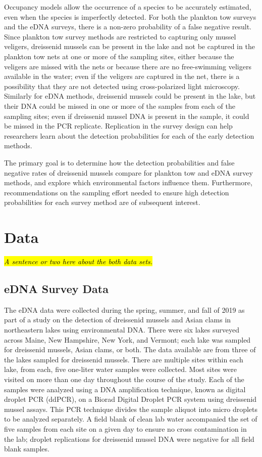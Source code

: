 \documentclass[12pt]{article}\usepackage[]{graphicx}\usepackage[]{color}
\begin{document}
Occupancy models allow the occurrence of a species to be accurately estimated, even when the species is imperfectly detected. For both the plankton tow surveys and the eDNA surveys, there is a non-zero probability of a false negative result. Since plankton tow survey methods are restricted to capturing only mussel veligers, dreissenid mussels can be present in the lake and not be captured in the plankton tow nets at one or more of the sampling sites, either because the veligers are missed with the nets or because there are no free-swimming veligers available in the water; even if the veligers are captured in the net, there is a possibility that they are not detected using cross-polarized light microscopy. Similarly for eDNA methods, dreissenid mussels could be present in the lake, but their DNA could be missed in one or more of the samples from each of the sampling sites; even if dreissenid mussel DNA is present in the sample, it could be missed in the PCR replicate. Replication in the survey design can help researchers learn about the detection probabilities for each of the early detection methods. 

The primary goal is to determine how the detection probabilities and false negative rates of dreissenid mussels compare for plankton tow and eDNA survey methods, and explore which environmental factors influence them. Furthermore, recommendations on the sampling effort needed to ensure high detection probabilities for each survey method are of subsequent interest. 

\section{Data}

\textit{\hl{A sentence or two here about the both data sets.}}

\subsection{eDNA Survey Data}



The eDNA data were collected during the spring, summer, and fall of 2019 as part of a study on the detection of dreissenid mussels and Asian clams in northeastern lakes using environmental DNA. There were six lakes surveyed across Maine, New Hampshire, New York, and Vermont; each lake was sampled for dreissenid mussels, Asian clams, or both. The data available are from three of the lakes sampled for dreissenid mussels. There are multiple sites within each lake, from each, five one-liter water samples were collected. Most sites were visited on more than one day throughout the course of the study. Each of the samples were analyzed using a DNA amplification technique, known as digital droplet PCR (ddPCR), on a Biorad Digital Droplet PCR system using dreissenid mussel assays. This PCR technique divides the sample aliquot into micro droplets to be analyzed separately. A field blank of clean lab water accompanied the set of five samples from each site on a given day to ensure no cross contamination in the lab; droplet replications for dreissenid mussel DNA were negative for all field blank samples. 
\end{document}
